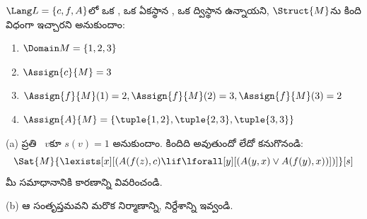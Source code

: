 \documentclass[../../../include/open-logic-section]{subfiles}
\begin{document}
\begin{prob}
$\Lang L = \{c, f, A\}$లో ఒక , ఒక ఏకస్థాన
, ఒక ద్విస్థాన  ఉన్నాయని, 
$\Struct{M}$ను కింది విధంగా ఇచ్చారని అనుకుందాం:
\begin{enumerate}
\item $\Domain M = \{1, 2, 3\}$
\item $\Assign{c}{M} = 3$
\item $\Assign{f}{M}(1) = 2, \Assign{f}{M}(2) = 3, \Assign{f}{M}(3) = 2$
\item $\Assign{A}{M} = \{\tuple{1, 2}, \tuple{2, 3}, \tuple{3, 3}\}$
\end{enumerate}
(a) ప్రతి ~$v$కూ $s(v) = 1$ అనుకుందాం. కిందిది
అవుతుందో లేదో కనుగొనండి:
\[
\Sat{M}{\lexists[x][(A(f(z), c) \lif \lforall[y][(A(y, x) \lor A(f(y),
      x))])]}[s]
\]
మీ సమాధానానికి కారణాన్ని వివరించండి.

(b) ఆ  సంతృప్తమవని మరొక నిర్మాణాన్ని, 
నిర్దేశాన్ని ఇవ్వండి.
\end{prob}
\end{document}
